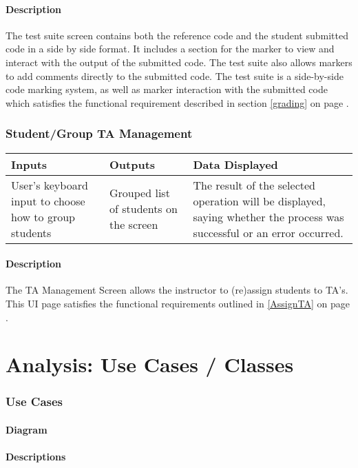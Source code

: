 \documentclass{article}
\begin{document}
\subsection{Description}
The test suite screen contains both the reference code and the student submitted
code in a side by side format.  It includes a section for the marker to view
and interact with the output of the submitted code.  The test suite also allows
markers to add comments directly to the submitted code.  The test suite is a
side-by-side code marking system, as well as marker interaction with the
submitted code which satisfies the functional requirement described in section
\ref{grading} on page \pageref{grading}.

\section{Student/Group TA Management}
\begin{tabular}{| p{5cm} | p{5cm} | p{5cm} |}
	\hline
	Inputs & Outputs & Data Displayed \\ \hline
	User's keyboard input to choose how to group students
	& Grouped list of students on the screen
	& The result of the selected operation will be displayed, saying whether
the process was successful or an error occurred.
	\\ \hline
\end{tabular}

\subsection{Description}
The TA Management Screen allows the instructor to (re)assign students to TA's.
This UI page satisfies the functional requirements outlined in \ref{AssignTA}
on page \pageref{AssignTA}.

\part{Analysis: Use Cases / Classes}
\section{Use Cases}
\subsection{Diagram}
\subsection{Descriptions}
\end{document}
